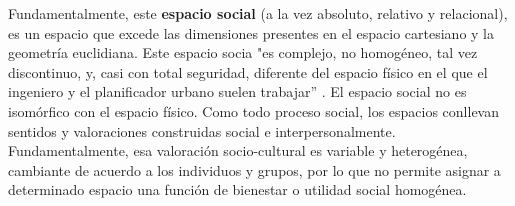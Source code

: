 Fundamentalmente, este \textbf{espacio social} (a la vez absoluto, relativo y relacional), es un espacio que excede las dimensiones presentes en el espacio cartesiano y la geometría euclidiana. Este espacio socia "es complejo, no homogéneo, tal vez discontinuo, y, casi con total seguridad, diferente del espacio físico en el que el ingeniero y el planificador urbano suelen trabajar” \cite[~35]{harvey}. El espacio social no es isomórfico con el espacio físico. Como todo proceso social, los espacios conllevan sentidos y valoraciones construidas social e interpersonalmente. Fundamentalmente, esa valoración socio-cultural es variable y heterogénea, cambiante de acuerdo a los individuos y grupos, por lo que no permite asignar a determinado espacio una función de bienestar o utilidad social homogénea. 



